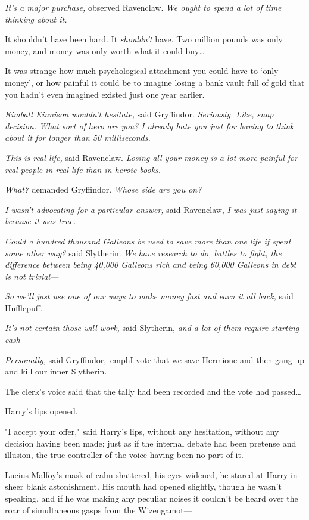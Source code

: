 \emph{It's a major purchase,} observed Ravenclaw. \emph{We ought to spend a lot 
of time thinking about it.}

It shouldn't have been hard. It \emph{shouldn't} have. Two million pounds was 
only money, and money was only worth what it could buy{\ldots}

It was strange how much psychological attachment you could have to `only 
money', or how painful it could be to imagine losing a bank vault full of gold 
that you hadn't even imagined existed just one year earlier.

\emph{Kimball Kinnison wouldn't hesitate,} said Gryffindor. \emph{Seriously. 
Like, snap decision. What sort of hero are you? I already hate you just for 
having to think about it for longer than 50 milliseconds.}

\emph{This is real life,} said Ravenclaw. \emph{Losing all your money is a lot 
more painful for real people in real life than in heroic books.}

\emph{What?} demanded Gryffindor. \emph{Whose side are you on?}

\emph{I wasn't advocating for a particular answer,} said Ravenclaw, \emph{I was 
just saying it because it was true.}

\emph{Could a hundred thousand Galleons be used to save more than one life if 
spent some other way?} said Slytherin. \emph{We have research to do, battles to 
fight, the difference between being 40,000 Galleons rich and being 60,000 
Galleons in debt is not trivial---}

\emph{So we'll just use one of our ways to make money fast and earn it all 
back,} said Hufflepuff.

\emph{It's not certain those will work,} said Slytherin, \emph{and a lot of 
them require starting cash---}

\emph{Personally,} said Gryffindor,\ emph{I vote that we save Hermione and then 
gang up and kill our inner Slytherin.}

The clerk's voice said that the tally had been recorded and the vote had 
passed{\ldots}

Harry's lips opened.

"I accept your offer," said Harry's lips, without any hesitation, without any 
decision having been made; just as if the internal debate had been pretense and 
illusion, the true controller of the voice having been no part of it.

Lucius Malfoy's mask of calm shattered, his eyes widened, he stared at Harry in 
sheer blank astonishment. His mouth had opened slightly, though he wasn't 
speaking, and if he was making any peculiar noises it couldn't be heard over 
the roar of simultaneous gasps from the Wizengamot---

